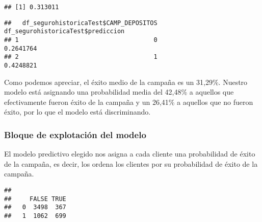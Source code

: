 \documentclass[]{article}
\newenvironment{Shaded}{\begin{snugshade}}{\end{snugshade}}
\newcommand{\KeywordTok}[1]{\textcolor[rgb]{0.13,0.29,0.53}{\textbf{#1}}}
\newcommand{\DataTypeTok}[1]{\textcolor[rgb]{0.13,0.29,0.53}{#1}}
\newcommand{\FloatTok}[1]{\textcolor[rgb]{0.00,0.00,0.81}{#1}}
\newcommand{\OperatorTok}[1]{\textcolor[rgb]{0.81,0.36,0.00}{\textbf{#1}}}
\newcommand{\NormalTok}[1]{#1}
\begin{document}
\begin{verbatim}
## [1] 0.313011
\end{verbatim}

\begin{Shaded}
\end{Shaded}

\begin{verbatim}
##   df_segurohistoricaTest$CAMP_DEPOSITOS df_segurohistoricaTest$prediccion
## 1                                     0                         0.2641764
## 2                                     1                         0.4248821
\end{verbatim}

Como podemos apreciar, el éxito medio de la campaña es un 31,29\%.
Nuestro modelo está asignando una probabilidad media del 42,48\% a
aquellos que efectivamente fueron éxito de la campaña y un 26,41\% a
aquellos que no fueron éxito, por lo que el modelo está discriminando.

\subsubsection{Bloque de explotación del
modelo}\label{bloque-de-explotacion-del-modelo}

El modelo predictivo elegido nos asigna a cada cliente una probabilidad
de éxito de la campaña, es decir, los ordena los clientes por su
probabilidad de éxito de la campaña.

\begin{Shaded}
\end{Shaded}

\begin{verbatim}
##    
##     FALSE TRUE
##   0  3498  367
##   1  1062  699
\end{verbatim}
\end{document}
